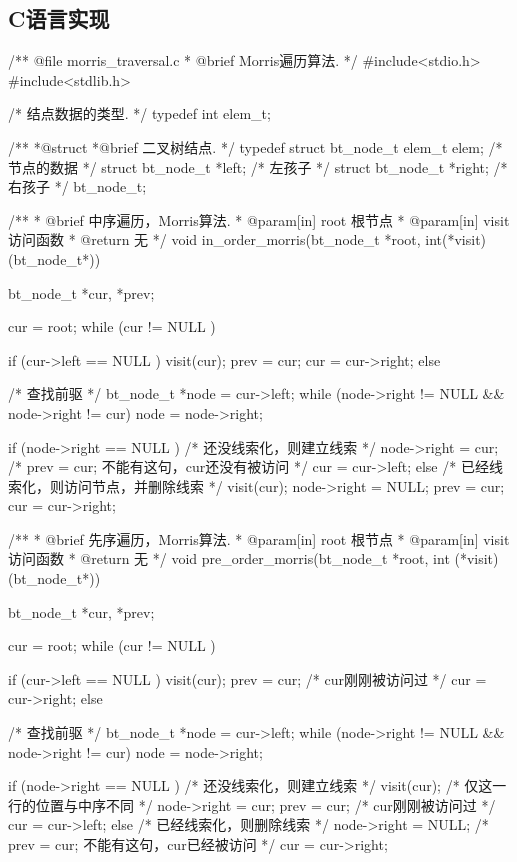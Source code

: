 \subsection{C语言实现}
\label{sec:morrisTraversalImpl}
\begin{Codex}[label=morris_traversal.c]
/** @file morris_traversal.c
 * @brief Morris遍历算法.
 */
#include<stdio.h>
#include<stdlib.h>

/* 结点数据的类型. */
typedef int elem_t;

/**
 *@struct
 *@brief 二叉树结点.
 */
typedef struct bt_node_t {
    elem_t elem; /* 节点的数据 */
    struct bt_node_t *left; /* 左孩子 */
    struct bt_node_t *right; /* 右孩子 */
} bt_node_t;

/**
 * @brief 中序遍历，Morris算法.
 * @param[in] root 根节点
 * @param[in] visit 访问函数
 * @return 无
 */
void in_order_morris(bt_node_t *root, int(*visit)(bt_node_t*)) {
    bt_node_t *cur, *prev;

    cur = root;
    while (cur != NULL ) {
        if (cur->left == NULL ) {
            visit(cur);
            prev = cur;
            cur = cur->right;
        } else {
            /* 查找前驱 */
            bt_node_t *node = cur->left;
            while (node->right != NULL && node->right != cur)
                node = node->right;

            if (node->right == NULL ) { /* 还没线索化，则建立线索 */
                node->right = cur;
                /* prev = cur; 不能有这句，cur还没有被访问 */
                cur = cur->left;
            } else {    /* 已经线索化，则访问节点，并删除线索  */
                visit(cur);
                node->right = NULL;
                prev = cur;
                cur = cur->right;
            }
        }
    }
}

/**
 * @brief 先序遍历，Morris算法.
 * @param[in] root 根节点
 * @param[in] visit 访问函数
 * @return 无
 */
void pre_order_morris(bt_node_t *root, int (*visit)(bt_node_t*)) {
    bt_node_t *cur, *prev;

    cur = root;
    while (cur != NULL ) {
        if (cur->left == NULL ) {
            visit(cur);
            prev = cur; /* cur刚刚被访问过 */
            cur = cur->right;
        } else {
            /* 查找前驱 */
            bt_node_t *node = cur->left;
            while (node->right != NULL && node->right != cur)
                node = node->right;

            if (node->right == NULL ) { /* 还没线索化，则建立线索 */
                visit(cur); /* 仅这一行的位置与中序不同 */
                node->right = cur;
                prev = cur; /* cur刚刚被访问过 */
                cur = cur->left;
            } else {    /* 已经线索化，则删除线索  */
                node->right = NULL;
                /* prev = cur; 不能有这句，cur已经被访问 */
                cur = cur->right;
            }
        }
    }
}



\end{Codex}
